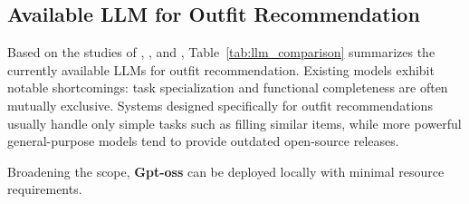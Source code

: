 \subsection{Available LLM for Outfit Recommendation}
\begin{table}[H]
\centering
\caption{Comparison of Available LLM Models for Outfit Recommendation}
\label{tab:llm_comparison}
\end{table}

Based on the studies of \cite{bi2025stepo}, \cite{wang2024text}, \cite{zhang2025collm} and \cite{openai2025gptoss}, Table~\ref{tab:llm_comparison} summarizes the currently available LLMs for outfit recommendation. Existing models exhibit notable shortcomings: task specialization and functional completeness are often mutually exclusive. Systems designed specifically for outfit recommendations usually handle only simple tasks such as filling similar items, while more powerful general-purpose models tend to provide outdated open-source releases. 

Broadening the scope, \textbf{Gpt-oss} can be deployed locally with minimal resource requirements.